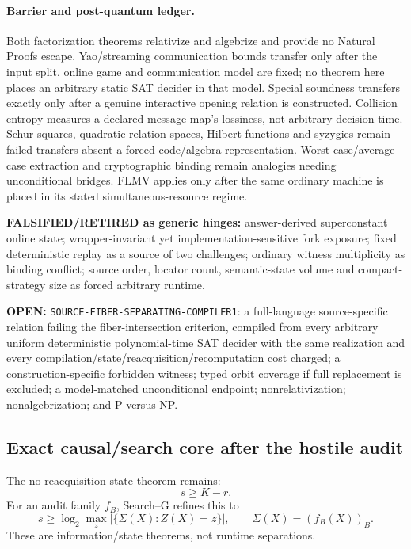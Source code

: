 \documentclass[11pt]{article}
\begin{document}
\paragraph{Barrier and post-quantum ledger.}
Both factorization theorems relativize and algebrize and provide no Natural
Proofs escape.  Yao/streaming communication bounds transfer only after the
input split, online game and communication model are fixed; no theorem here
places an arbitrary static SAT decider in that model.  Special soundness
transfers exactly only after a genuine interactive opening relation is
constructed.  Collision entropy measures a declared message map's lossiness,
not arbitrary decision time.  Schur squares, quadratic relation spaces,
Hilbert functions and syzygies remain failed transfers absent a forced
code/algebra representation.  Worst-case/average-case extraction and
cryptographic binding remain analogies needing unconditional bridges.  FLMV
applies only after the same ordinary machine is placed in its stated
simultaneous-resource regime.

\textbf{FALSIFIED/RETIRED as generic hinges:} answer-derived
superconstant online state; wrapper-invariant yet implementation-sensitive
fork exposure; fixed deterministic replay as a source of two challenges;
ordinary witness multiplicity as binding conflict; source order, locator
count, semantic-state volume and compact-strategy size as forced arbitrary
runtime.

\textbf{OPEN:} \texttt{SOURCE-FIBER-SEPARATING-COMPILER1}: a full-language
source-specific relation failing the fiber-intersection criterion, compiled
from every arbitrary uniform deterministic polynomial-time SAT decider with
the same realization and every compilation/state/reacquisition/recomputation
cost charged; a construction-specific forbidden witness; typed orbit coverage
if full replacement is excluded; a model-matched unconditional endpoint;
nonrelativization; nonalgebrization; and P versus NP.

\subsection{Exact causal/search core after the hostile audit}

The no-reacquisition state theorem remains:
\[
\boxed{s\ge K-r.}
\]
For an audit family \(f_B\), Search--G refines this to
\[
\boxed{
s\ge
\log_2\max_z
\left|\{\Sigma(X):Z(X)=z\}\right|,
\qquad
\Sigma(X)=(f_B(X))_B.
}
\]
These are information/state theorems, not runtime separations.
\end{document}
